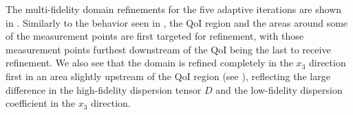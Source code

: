 \documentclass[review,sort&compress]{elsarticle}
\begin{document}
The multi-fidelity domain refinements for the five adaptive iterations are shown in . Similarly to the behavior seen in , the QoI region and the areas around some of the measurement points are first targeted for refinement, with those measurement points furthest downstream of the QoI being the last to receive refinement. We also see that the domain is refined completely in the $x_3$ direction first in an area slightly upstream of the QoI region (see ), reflecting the large difference in the high-fidelity dispersion tensor $D$ and the low-fidelity dispersion coefficient in the $x_3$ direction.
%
\begin{figure}[htbp]
\centering
{}
\hfill
{}
\\
\end{figure}
\end{document}

